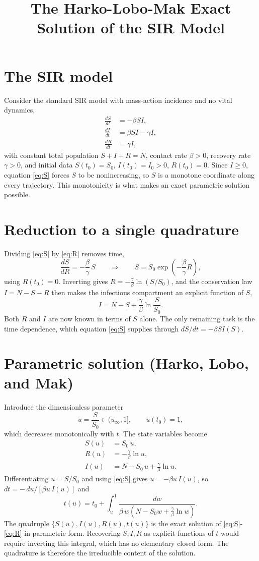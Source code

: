 \documentclass[11pt]{article}
\title{The Harko-Lobo-Mak Exact Solution of the SIR Model}
\author{}
\date{}
\begin{document}
\maketitle

\section{The SIR model}
Consider the standard SIR model with mass-action incidence and no vital dynamics,
\begin{align}
\frac{dS}{dt} &= -\beta S I, \label{eq:S}\\
\frac{dI}{dt} &= \beta S I - \gamma I, \label{eq:I}\\
\frac{dR}{dt} &= \gamma I, \label{eq:R}
\end{align}
with constant total population $S + I + R = N$, contact rate $\beta > 0$, recovery
rate $\gamma > 0$, and initial data $S(t_0) = S_0$, $I(t_0) = I_0 > 0$, $R(t_0) = 0$.
Since $I \ge 0$, equation \eqref{eq:S} forces $S$ to be nonincreasing, so $S$ is a
monotone coordinate along every trajectory. This monotonicity is what makes an exact
parametric solution possible.

\section{Reduction to a single quadrature}
Dividing \eqref{eq:S} by \eqref{eq:R} removes time,
\[
\frac{dS}{dR} = -\frac{\beta}{\gamma}\, S
\qquad\Longrightarrow\qquad
S = S_0 \exp\!\left(-\frac{\beta}{\gamma} R\right),
\]
using $R(t_0) = 0$. Inverting gives $R = -\frac{\gamma}{\beta} \ln(S/S_0)$, and the
conservation law $I = N - S - R$ then makes the infectious compartment an explicit
function of $S$,
\[
I = N - S + \frac{\gamma}{\beta} \ln\frac{S}{S_0}.
\]
Both $R$ and $I$ are now known in terms of $S$ alone. The only remaining task is the
time dependence, which equation \eqref{eq:S} supplies through $dS/dt = -\beta S I(S)$.

\section{Parametric solution (Harko, Lobo, and Mak)}
Introduce the dimensionless parameter
\[
u = \frac{S}{S_0} \in (u_\infty, 1], \qquad u(t_0) = 1,
\]
which decreases monotonically with $t$. The state variables become
\begin{align}
S(u) &= S_0\, u, \\
R(u) &= -\frac{\gamma}{\beta} \ln u, \\
I(u) &= N - S_0\, u + \frac{\gamma}{\beta} \ln u.
\end{align}
Differentiating $u = S/S_0$ and using \eqref{eq:S} gives $\dot u = -\beta u\, I(u)$,
so $dt = -\,du / [\beta u\, I(u)]$ and
\[
t(u) = t_0 + \int_{u}^{1}
\frac{dw}{\beta\, w\left(N - S_0 w + \frac{\gamma}{\beta} \ln w\right)}.
\]
The quadruple $\{S(u), I(u), R(u), t(u)\}$ is the exact solution of
\eqref{eq:S}-\eqref{eq:R} in parametric form. Recovering $S, I, R$ as explicit
functions of $t$ would require inverting this integral, which has no elementary
closed form. The quadrature is therefore the irreducible content of the solution.
\end{document}
